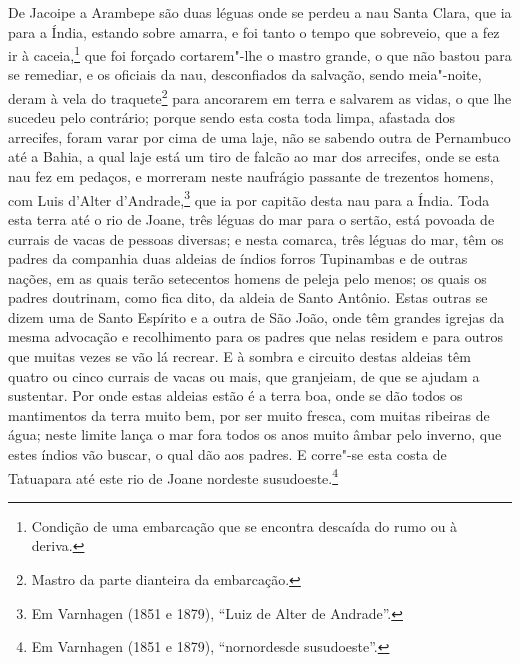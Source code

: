 \begin{linenumbers}
De Jacoipe a Arambepe são duas léguas onde se perdeu a nau Santa Clara, que ia para a
Índia, estando sobre amarra, e foi tanto o tempo que sobreveio, que a fez ir à
caceia,\footnote{ Condição de uma embarcação que se encontra descaída do rumo ou à
deriva.} que foi forçado cortarem"-lhe o mastro grande, o que não bastou para se remediar,
e os oficiais da nau, desconfiados da salvação, sendo meia"-noite, deram à vela do
traquete\footnote{ Mastro da parte dianteira da embarcação.} para
ancorarem em terra e salvarem as vidas, o que lhe sucedeu pelo contrário; porque sendo
esta costa toda limpa, afastada dos arrecifes, foram varar por cima de uma laje, não se
sabendo outra de Pernambuco até a Bahia, a qual laje está um tiro de falcão ao mar dos
arrecifes, onde se esta nau fez em pedaços, e morreram neste naufrágio passante
de  trezentos homens, com Luis d'Alter d'Andrade,\footnote{ Em Varnhagen (1851 e
1879), ``Luiz de Alter de Andrade''.} que ia por capitão desta nau para a Índia. Toda esta
terra até o rio de Joane, três léguas do mar para o sertão, está povoada de currais de
vacas de pessoas diversas; e nesta comarca, três léguas do mar, têm os padres da companhia
duas aldeias de índios forros Tupinambas e de outras nações, em as quais terão setecentos
homens de peleja pelo menos; os quais os padres doutrinam, como fica dito, da aldeia de
Santo Antônio. Estas outras se dizem uma de Santo Espírito e a outra de São João, onde têm
grandes igrejas da mesma advocação e recolhimento para os padres que nelas residem e para
outros que muitas vezes se vão lá recrear. E à sombra e circuito destas aldeias têm quatro
ou cinco currais de vacas ou mais, que granjeiam, de que se ajudam a sustentar. Por onde
estas aldeias estão é a terra boa, onde se dão todos os mantimentos da terra muito bem,
por ser muito fresca, com muitas ribeiras de água; neste limite lança o mar fora todos os
anos muito âmbar pelo inverno, que estes índios vão buscar, o qual dão aos padres. E
corre"-se esta costa de Tatuapara até este rio de Joane nordeste susudoeste.\footnote{ Em
Varnhagen (1851 e 1879), ``nornordesde susudoeste''.}


\end{linenumbers}
